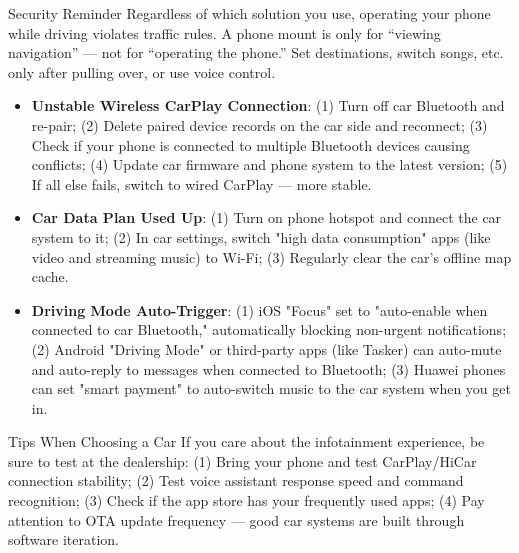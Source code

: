 \begin{tcbwarn}{Security Reminder}
Regardless of which solution you use, operating your phone while driving violates traffic rules. A phone mount is only for “viewing navigation” — not for “operating the phone.” Set destinations, switch songs, etc. only after pulling over, or use voice control.

\end{tcbwarn}


\begin{itemize}
  \item \textbf{Unstable Wireless CarPlay Connection}: (1) Turn off car Bluetooth and re-pair; (2) Delete paired device records on the car side and reconnect; (3) Check if your phone is connected to multiple Bluetooth devices causing conflicts; (4) Update car firmware and phone system to the latest version; (5) If all else fails, switch to wired CarPlay — more stable.
  \item \textbf{Car Data Plan Used Up}: (1) Turn on phone hotspot and connect the car system to it; (2) In car settings, switch "high data consumption" apps (like video and streaming music) to Wi-Fi; (3) Regularly clear the car's offline map cache.
  \item \textbf{Driving Mode Auto-Trigger}: (1) iOS "Focus" set to "auto-enable when connected to car Bluetooth," automatically blocking non-urgent notifications; (2) Android "Driving Mode" or third-party apps (like Tasker) can auto-mute and auto-reply to messages when connected to Bluetooth; (3) Huawei phones can set "smart payment" to auto-switch music to the car system when you get in.
\end{itemize}

\begin{tcbinfo}{Tips When Choosing a Car}
If you care about the infotainment experience, be sure to test at the dealership: (1) Bring your phone and test CarPlay/HiCar connection stability; (2) Test voice assistant response speed and command recognition; (3) Check if the app store has your frequently used apps; (4) Pay attention to OTA update frequency — good car systems are built through software iteration.

\end{tcbinfo}

